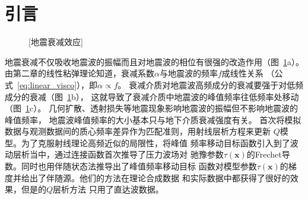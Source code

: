 \section{引言}
\begin{figure}[!htbp]
    \centering
    [地震衰减效应]
    \label{fig:q_effect}
\end{figure}
地震衰减不仅吸收地震波的振幅而且对地震波的相位有很强的改造作用（图~\ref{fig:q_effect}a）。
由第二章的线性粘弹理论知道，衰减系数$\alpha$与地震波的频率$f$成线性关系
（公式~\ref{eq:linear_visco}），即$\alpha\propto f$。
衰减介质对地震波高频成分的衰减要强于对低频成分的衰减（图~\ref{fig:q_effect}b），
这就导致了衰减介质中地震波的峰值频率往低频率处移动（图~\ref{fig:q_effect}c）。
几何扩散、透射损失等地震现象影响地震波的振幅但不影响地震波的峰值频率，
地震波峰值频率的大小基本只与地下介质衰减强度有关。
首次将模拟数据与观测数据间的质心频率差异作为匹配准则，用射线层析方程来更新
$Q$模型。为了克服射线理论高频近似的局限性，将峰值
频率移动目标函数引入到了波动层析当中，通过连接函数首次推导了压力波场对
驰豫参数$\tau(\mathbf{x})$的Frechet导数。同时也用伴随状态法推导出了峰值频率移动目标
函数对模型参数$\tau(\mathbf{x})$的梯度并给出了伴随源。他们的方法在理论合成数据
和实际数据中都获得了很好的效果，但是的$Q$层析方法
只用了直达波数据。

